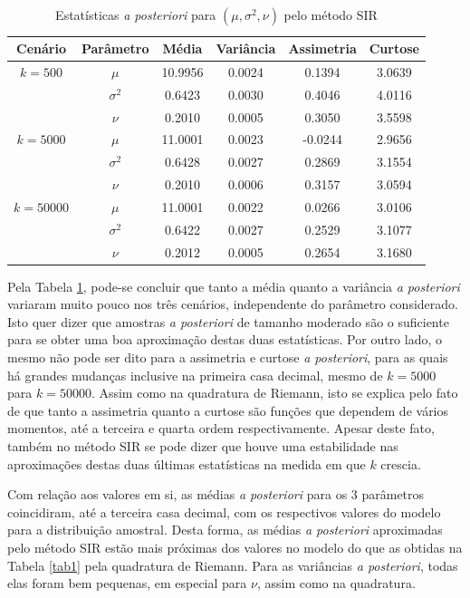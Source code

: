 \begin{table}[htb]
	\caption{Estatísticas \textit{a posteriori} para $(\mu, \sigma^2, \nu)$ pelo método SIR}
	\label{tab2}
	\centering
	\begin{tabular}{cccccc}
		\toprule
		Cenário & Parâmetro & Média & Variância & Assimetria & Curtose \\
		\midrule
		$k = 500$ & $\mu$      & 10.9956 & 0.0024 & 0.1394 & 3.0639 \\
		          & $\sigma^2$ &  0.6423 & 0.0030 & 0.4046 & 4.0116 \\
		          & $\nu$      &  0.2010 & 0.0005 & 0.3050 & 3.5598 \\
		\midrule
		$k = 5000$ & $\mu$      & 11.0001 & 0.0023 & -0.0244 & 2.9656 \\
		           & $\sigma^2$ &  0.6428 & 0.0027 &  0.2869 & 3.1554 \\
		           & $\nu$      &  0.2010 & 0.0006 &  0.3157 & 3.0594 \\
		\midrule
		$k = 50000$ & $\mu$      & 11.0001 & 0.0022 & 0.0266 & 3.0106 \\
		            & $\sigma^2$ &  0.6422 & 0.0027 & 0.2529 & 3.1077 \\
		            & $\nu$      &  0.2012 & 0.0005 & 0.2654 & 3.1680 \\
		\bottomrule
	\end{tabular}
\end{table}

Pela Tabela \ref{tab2}, pode-se concluir que tanto a média quanto a variância \textit{a posteriori} variaram muito pouco nos três cenários, independente do parâmetro considerado. Isto quer dizer que amostras \textit{a posteriori} de tamanho moderado são o suficiente para se obter uma boa aproximação destas duas estatísticas. Por outro lado, o mesmo não pode ser dito para a assimetria e curtose \textit{a posteriori}, para as quais há grandes mudanças inclusive na primeira casa decimal, mesmo de $k=5000$ para $k=50000$. Assim como na quadratura de Riemann, isto se explica pelo fato de que tanto a assimetria quanto a curtose são funções que dependem de vários momentos, até a terceira e quarta ordem respectivamente. Apesar deste fato, também no método SIR se pode dizer que houve uma estabilidade nas aproximações destas duas últimas estatísticas na medida em que $k$ crescia.

Com relação aos valores em si, as médias \textit{a posteriori} para os 3 parâmetros coincidiram, até a terceira casa decimal, com os respectivos valores do modelo para a distribuição amostral. Desta forma, as médias \textit{a posteriori} aproximadas pelo método SIR estão mais próximas dos valores no modelo do que as obtidas na Tabela \ref{tab1} pela quadratura de Riemann. Para as variâncias \textit{a posteriori}, todas elas foram bem pequenas, em especial para $\nu$, assim como na quadratura.

